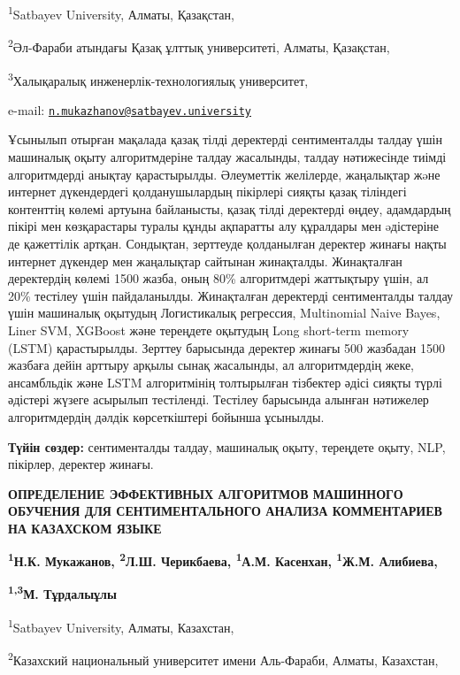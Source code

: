 \textsuperscript{1}Satbayev University, Алматы, Қазақстан,

\textsuperscript{2}Әл-Фараби атындағы Қазақ ұлттық университеті, Алматы,
Қазақстан,

\textsuperscript{3}Халықаралық инженерлік-технологиялық университет,

e-mail:
\href{mailto:n.mukazhanov@satbayev.university}{\nolinkurl{n.mukazhanov@satbayev.university}}

Ұсынылып отырған мақалада қазақ тілді деректерді сентименталды талдау
үшін машиналық оқыту алгоритмдеріне талдау жасалынды, талдау нәтижесінде
тиімді алгоритмдерді анықтау қарастырылды. Әлеуметтік желілерде,
жаңалықтар жəне интернет дүкендердегі қолданушылардың пікірлері сияқты
қазақ тіліндегі контенттің көлемі артуына байланысты, қазақ тілді
деректерді өңдеу, адамдардың пікірі мен көзқарастары туралы құнды
ақпаратты алу құралдары мен əдістеріне де қажеттілік артқан. Сондықтан,
зерттеуде қолданылған деректер жинағы нақты интернет дүкендер мен
жаңалықтар сайтынан жинақталды. Жинақталған деректердің көлемі 1500
жазба, оның 80\% алгоритмдері жаттықтыру үшін, ал 20\% тестілеу үшін
пайдаланылды. Жинақталған деректерді сентименталды талдау үшін машиналық
оқытудың Логистикалық регрессия, Multinomial Naive Bayes, Liner SVM,
XGBoost және тереңдете оқытудың Long short-term memory (LSTM)
қарастырылды. Зерттеу барысында деректер жинағы 500 жазбадан 1500
жазбаға дейін арттыру арқылы сынақ жасалынды, ал алгоритмдердің жеке,
ансамбльдік және LSTM алгоритмінің толтырылған тізбектер әдісі сияқты
түрлі әдістері жүзеге асырылып тестіленді. Тестілеу барысында алынған
нәтижелер алгоритмдердің дәлдік көрсеткіштері бойынша ұсынылды.

{\bfseries Түйін сөздер:} сентименталды талдау, машиналық оқыту, тереңдете
оқыту, NLP, пікірлер, деректер жинағы.

{\bfseries ОПРЕДЕЛЕНИЕ ЭФФЕКТИВНЫХ АЛГОРИТМОВ МАШИННОГО ОБУЧЕНИЯ ДЛЯ
СЕНТИМЕНТАЛЬНОГО АНАЛИЗА КОММЕНТАРИЕВ НА КАЗАХСКОМ ЯЗЫКЕ}

{\bfseries \textsuperscript{1}Н.К. Мукажанов\textsuperscript{\envelope },
\textsuperscript{2}Л.Ш. Черикбаева, \textsuperscript{1}А.М. Касенхан,
\textsuperscript{1}Ж.М. Алибиева,}

{\bfseries \textsuperscript{1,3}М. Тұрдалыұлы}

\textsuperscript{1}Satbayev University, Алматы, Казахстан,

\textsuperscript{2}Казахский национальный университет имени Аль-Фараби,
Алматы, Казахстан,

